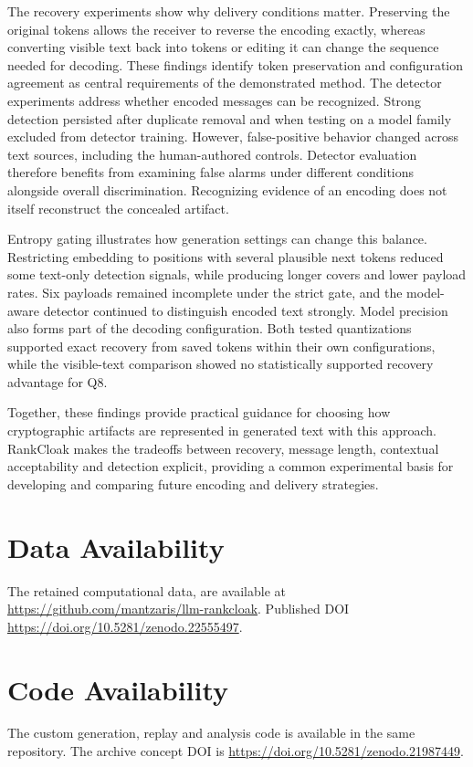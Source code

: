 \documentclass[fleqn,10pt]{wlscirep}
\begin{document}
The recovery experiments show why delivery conditions matter. Preserving the original tokens allows the receiver to reverse the encoding exactly, whereas converting visible text back into tokens or editing it can change the sequence needed for decoding. These findings identify token preservation and configuration agreement as central requirements of the demonstrated method. The detector experiments address whether encoded messages can be recognized. Strong detection persisted after duplicate removal and when testing on a model family excluded from detector training. However, false-positive behavior changed across text sources, including the human-authored controls. Detector evaluation therefore benefits from examining false alarms under different conditions alongside overall discrimination. Recognizing evidence of an encoding does not itself reconstruct the concealed artifact.

Entropy gating illustrates how generation settings can change this balance. Restricting embedding to positions with several plausible next tokens reduced some text-only detection signals, while producing longer covers and lower payload rates. Six payloads remained incomplete under the strict gate, and the model-aware detector continued to distinguish encoded text strongly. Model precision also forms part of the decoding configuration. Both tested quantizations supported exact recovery from saved tokens within their own configurations, while the visible-text comparison showed no statistically supported recovery advantage for Q8.

Together, these findings provide practical guidance for choosing how cryptographic artifacts are represented in generated text with this approach. RankCloak makes the tradeoffs between recovery, message length, contextual acceptability and detection explicit, providing a common experimental basis for developing and comparing future encoding and delivery strategies.






\section*{Data Availability}\label{sec:data-code}

The retained computational data, are available at \url{https://github.com/mantzaris/llm-rankcloak}. Published DOI \url{https://doi.org/10.5281/zenodo.22555497}.

\section*{Code Availability}
The custom generation, replay and analysis code is available in the same repository. The archive concept DOI is \url{https://doi.org/10.5281/zenodo.21987449}. 
\end{document}
